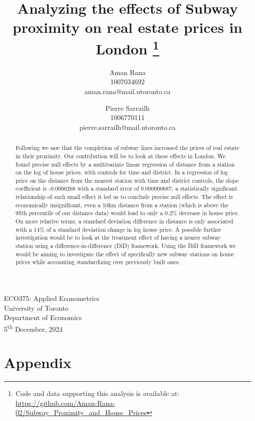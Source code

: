 \documentclass[11pt,a4paper,english]{article}
\date{\displaydate{date}}
\title{Analyzing the effects of Subway proximity on real estate prices in London 
\thanks{Code and data supporting this analysis is available at: \url{https://github.com/Aman-Rana-02/Subway_Proximity_and_House_Prices}}}
\author{%
  Aman Rana \\ 1007034692 \\ aman.rana@mail.utoronto.ca
  \and
  Pierre Sarrailh \\ 1006770111 \\ pierre.sarrailh@mail.utoronto.ca
}
\date{}
\begin{document}
  \maketitle
  \begin{center}
    ECO375: Applied Econometrics \\ 
    University of Toronto \\ 
    Department of Economics \\
    5\textsuperscript{th} December, 2024
  \end{center}

  \begin{abstract}
    \noindent Following \citet{zhou_2019} we saw that the completion of subway lines increased the prices of real estate in their proximity. Our contribution will be to look at these effects in London. 
     We found precise null effects by a multivariate linear regression of distance from a station on the log of house prices, with controls for time and district. In a regression of log price on the distance 
     from the nearest station with time and district controls, the slope coefficient is -0.0000268 with a standard error of 0.000000687, 
     a statistically significant relationship of such small effect it led us to conclude precise null effects. 
     The effect is economically insignificant, even a 10km distance from a station (which is above the 95th 
     percentile of our distance data) would lead to only a 0.2\% decrease in house price. 
     On more relative terms, a standard deviation difference in distance is only associated with a 
     14\% of a standard deviation change in log house price. 
     A possible further investigation would be to look at the treatment effect of having a 
     nearer subway station using a difference-in-difference (DiD) framework. 
     Using the DiD framework we would be aiming to investigate the effect of specifically 
     new subway stations on house prices while accounting standardizing over previously built ones.
  \end{abstract}


  \newpage
  

  

  

  

  \newpage
  
  

  \newpage
  \section*{Appendix}
  \renewcommand{\thesection}{\Alph{section}}
  \setcounter{section}{0}
  
\end{document}
